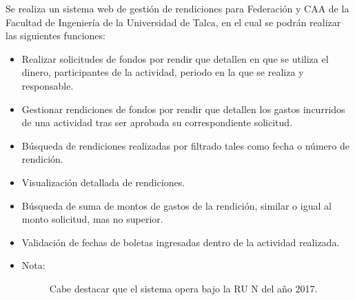 

Se realiza un sistema web de gestión de rendiciones para Federación y CAA de la Facultad de Ingeniería de la Universidad de Talca, en el cual se podrán realizar las siguientes funciones:

\begin{itemize}
	\item Realizar solicitudes de fondos por rendir que detallen en que se utiliza el dinero, participantes de la actividad, periodo en la que se realiza y responsable.

	\item Gestionar rendiciones de fondos por rendir que detallen los gastos incurridos de una actividad tras ser aprobada su correspondiente solicitud.
	
	\item Búsqueda de rendiciones realizadas por filtrado tales como fecha o número de rendición.
	
	\item Visualización detallada de rendiciones.
	
	\item Búsqueda de suma de montos de gastos de la rendición, similar o igual al monto solicitud, mas no superior.
	
	\item Validación de fechas de boletas ingresadas dentro de la actividad realizada.
\end{itemize}

\begin{itemize}
	\item 	\begin{description}
			    \item[Nota:] Cabe destacar que el sistema opera bajo la RU N del año 2017.
			\end{description}
\end{itemize}

